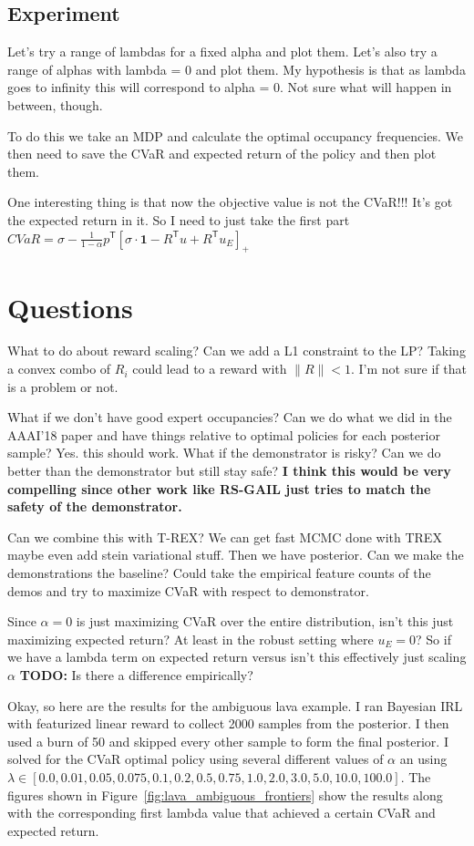 \documentclass{article}
\newcommand{\tr}{^\mathsf{T}}
\newcommand{\one}{\mathbf{1}}
\begin{document}
\subsection{Experiment}
Let's try a range of lambdas for a fixed alpha and plot them. 
Let's also try a range of alphas with lambda = 0 and plot them. 
My hypothesis is that as lambda goes to infinity this will correspond to alpha = 0. Not sure what will happen in between, though.

To do this we take an MDP and calculate the optimal occupancy frequencies. We then need to save the CVaR and expected return of the policy and then plot them.

One interesting thing is that now the objective value is not the CVaR!!! It's got the expected return in it. So I need to just take the first part 
$CVaR = \sigma -\frac{1}{1-\alpha} p\tr \left[\sigma\cdot\one - R\tr u  + R\tr u_E \right]_+$



\section{Questions}
What to do about reward scaling? Can we add a L1 constraint to the LP? Taking a convex combo of $R_i$ could lead to a reward with $\|R\|<1$. I'm not sure if that is a problem or not.


What if we don't have good expert occupancies?
Can we do what we did in the AAAI'18 paper and have things relative to optimal policies for each posterior sample? Yes. this should work. What if the demonstrator is risky? Can we do better than the demonstrator but still stay safe? \textbf{I think this would be very compelling since other work like RS-GAIL just tries to match the safety of the demonstrator.}

Can we combine this with T-REX? We can get fast MCMC done with TREX maybe even add stein variational stuff. Then we have posterior. Can we make the demonstrations the baseline? Could take the empirical feature counts of the demos and try to maximize CVaR with respect to demonstrator.  

Since $\alpha=0$ is just maximizing CVaR over the entire distribution, isn't this just maximizing expected return? At least in the robust setting where $u_E = 0$? So if we have a lambda term on expected return versus isn't this effectively just scaling $\alpha$ \textbf{TODO: } Is there a difference empirically?

Okay, so here are the results for the ambiguous lava example. I ran Bayesian IRL with featurized linear reward to collect 2000 samples from the posterior. I then used a burn of 50 and skipped every other sample to form the final posterior. I solved for the CVaR optimal policy using several different values of $\alpha$ an using $\lambda \in [0.0, 0.01, 0.05, 0.075, 0.1, 0.2, 0.5, 0.75, 1.0, 2.0, 3.0, 5.0, 10.0, 100.0]$. The figures shown in Figure~\ref{fig:lava_ambiguous_frontiers} show the results along with the corresponding first lambda value that achieved a certain CVaR and expected return.
\end{document}
